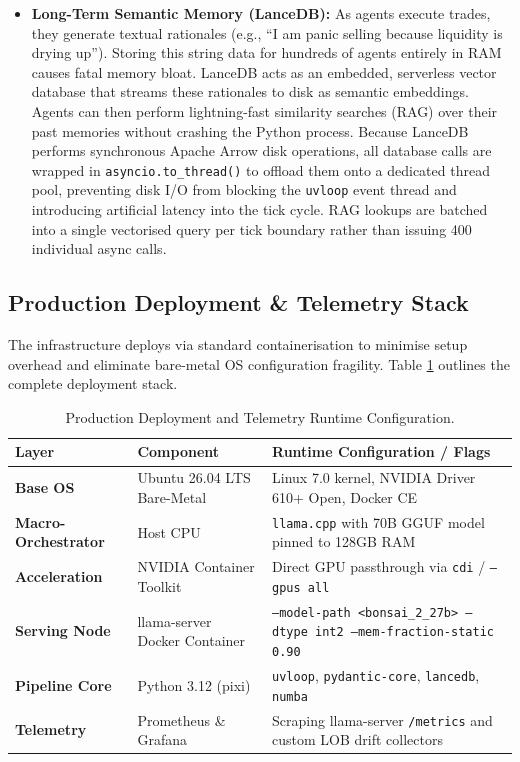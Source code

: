 \documentclass[10pt,a4paper]{article}
\begin{document}
\begin{itemize}
    \item \textbf{Long-Term Semantic Memory (LanceDB):} As agents execute trades, they generate textual rationales (e.g., ``I am panic selling because liquidity is drying up''). Storing this string data for hundreds of agents entirely in RAM causes fatal memory bloat. LanceDB acts as an embedded, serverless vector database that streams these rationales to disk as semantic embeddings. Agents can then perform lightning-fast similarity searches (RAG) over their past memories without crashing the Python process. Because LanceDB performs synchronous Apache Arrow disk operations, all database calls are wrapped in \texttt{asyncio.to\_thread()} to offload them onto a dedicated thread pool, preventing disk I/O from blocking the \texttt{uvloop} event thread and introducing artificial latency into the tick cycle. RAG lookups are batched into a single vectorised query per tick boundary rather than issuing 400 individual async calls.
\end{itemize}

\subsection{Production Deployment \& Telemetry Stack}

The infrastructure deploys via standard containerisation to minimise setup overhead and eliminate bare-metal OS configuration fragility. Table \ref{tab:telemetry_stack} outlines the complete deployment stack.

\begin{table}[b]
\centering
\caption{Production Deployment and Telemetry Runtime Configuration.}
\label{tab:telemetry_stack}
\renewcommand{\arraystretch}{1.3}
\begin{tabular}{|l|l|p{6cm}|}
\hline
\textbf{Layer} & \textbf{Component} & \textbf{Runtime Configuration / Flags} \\ \hline
\textbf{Base OS} & Ubuntu 26.04 LTS Bare-Metal & Linux 7.0 kernel, NVIDIA Driver 610+ Open, Docker CE \\ \hline
\textbf{Macro-Orchestrator} & Host CPU & \texttt{llama.cpp} with 70B GGUF model pinned to 128GB RAM \\ \hline
\textbf{Acceleration} & NVIDIA Container Toolkit & Direct GPU passthrough via \texttt{cdi} / \texttt{--gpus all} \\ \hline
\textbf{Serving Node} & llama-server Docker Container & \texttt{--model-path <bonsai\_2\_27b> --dtype int2 --mem-fraction-static 0.90} \\ \hline
\textbf{Pipeline Core} & Python 3.12 (pixi) & \texttt{uvloop}, \texttt{pydantic-core}, \texttt{lancedb}, \texttt{numba} \\ \hline
\textbf{Telemetry} & Prometheus \& Grafana & Scraping llama-server \texttt{/metrics} and custom LOB drift collectors \\ \hline
\end{tabular}
\end{table}
\end{document}
